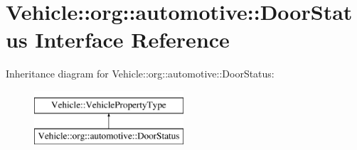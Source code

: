 \hypertarget{interfaceVehicle_1_1org_1_1automotive_1_1DoorStatus}{\section{Vehicle\-:\-:org\-:\-:automotive\-:\-:Door\-Status Interface Reference}
\label{interfaceVehicle_1_1org_1_1automotive_1_1DoorStatus}
}
Inheritance diagram for Vehicle\-:\-:org\-:\-:automotive\-:\-:Door\-Status\-:\begin{figure}[H]
\begin{center}
\leavevmode
\includegraphics[height=2.000000cm]{interfaceVehicle_1_1org_1_1automotive_1_1DoorStatus}
\end{center}
\end{figure}
